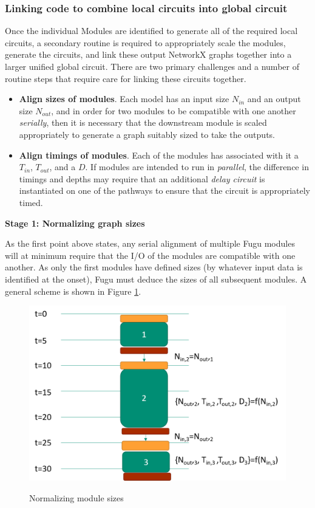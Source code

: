 \documentclass{article}
\begin{document}
\subsubsection{Linking code to combine local circuits into global circuit}

Once the individual Modules are identified to generate all of the required local circuits, a secondary routine is required to appropriately scale the modules, generate the circuits, and link these output NetworkX graphs together into a larger unified global circuit.  There are two primary challenges and a number of routine steps that require care for linking these circuits together.  

\begin{itemize}
\item \textbf{Align sizes of modules}.  Each model has an input size $N_{in}$ and an output size $N_{out}$, and in order for two modules to be compatible with one another \textit{serially}, then it is necessary that the downstream module is scaled appropriately to generate a graph suitably sized to take the outputs.  
\item \textbf{Align timings of modules}.  Each of the modules has associated with it a $T_{in}$, $T_{out}$, and a $D$.  If modules are intended to run in \textit{parallel}, the difference in timings and depths may require that an additional \textit{delay circuit} is instantiated on one of the pathways to ensure that the circuit is appropriately timed.
\end{itemize}

\textbf{Stage 1: Normalizing graph sizes}

As the first point above states, any serial alignment of multiple Fugu modules will at minimum require that the I/O of the modules are compatible with one another.   As only the first modules have defined sizes (by whatever input data is identified at the onset), Fugu must deduce the sizes of all subsequent modules.  A general scheme is shown in Figure \ref{serial_link}. 

\begin{figure}
	\includegraphics[height=3in]{module_link_serial.png}
	\label{serial_link}
	\caption{Normalizing module sizes}
\end{figure}
\end{document}
